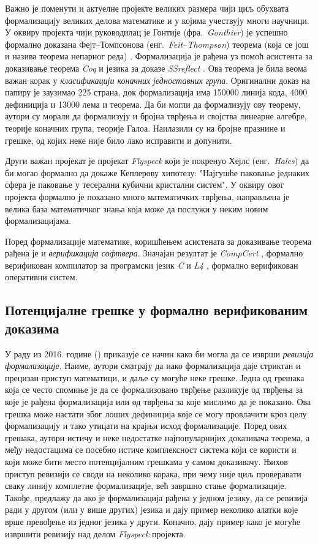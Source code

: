 Важно је поменути и актуелне пројекте великих размера чији циљ
обухвата формализацију великих делова математике и у којима учествују
многи научници. У оквиру пројекта чији руководилац је Гонтије
(фра.~\emph{Gonthier}) је успешно формално доказана Фејт--Томпсонова
(енг.~\emph{Feit--Thompson}) теорема (која се још и назива теорема
непарног реда) \cite{oddOrder}. Формализација је рађена уз помоћ
асистента за доказивање теорема \emph{Coq} и језика за доказе
\emph{SSreflect} \cite{gonthierSSReflect}. Ова теорема је била веома
важан корак у \emph{класификацији коначних једноставних
  група}. Оригинални доказ на папиру је заузимао 225 страна, док
формализација има 150000 линија кода, 4000 дефиниција и 13000 лема и
теорема. Да би могли да формализују ову теорему, аутори су морали да
формализују и бројна тврђења и својства линеарне алгебре, теорије
коначних група, теорије Галоа. Наилазили су на бројне празнине и
грешке, од којих неке није било лако исправити и допунити.

Други важан пројекат је пројекат \emph{Flyspeck} \cite{flyspeck} који
је покренуо Хејлс (енг.~\emph{Hales}) да би могао формално да докаже
Кеплерову хипотезу: "Најгушће паковање једнаких сфера је паковање у
тесерални кубични кристални систем". У оквиру овог пројекта формално
је показано много математичких тврђења, направљена је велика база
математичког знања која може да послужи у неким новим формализацијама.

Поред фор\-ма\-ли\-за\-ци\-је математике, коришћењем асистената за
доказивање теорема рађена је и \emph{верификација софтвера}. Значајан
резултат је \emph{CompCert} \cite{compcert1, compcert2}, формално
верификован компилатор за програмски језик \emph{C} и \emph{L4}
\cite{l4microkernel1, l4microkernel2}, формално верификован оперативни
систем.


\subsection{Потенцијалне грешке у формално верификованим доказима}

У раду из 2016. године (\cite{adams2015proof}) приказује се начин како
би могла да се изврши \emph{ревизија формализације}. Наиме, аутори
сматрају да иако формализација даје стриктан и прецизан приступ
математици, и даље су могуће неке грешке. Једна од грешака која се
често спомиње је да се формализовано тврђење разликује од тврђења за
које је рађена формализација или од тврђења за које мислимо да је
показано. Ова грешка може настати због лоших дефиниција које се могу
провлачити кроз целу формализацију и тако утицати на крајњи исход
формализације. Поред ових грешака, аутори истичу и неке недостатке
најпопуларнијих доказивача теорема, а међу недостацима се посебно
истиче комплексност система који се користи и који може бити место
потенцијалним грешкама у самом доказивачу. Њихов приступ ревизији се
своди на неколико корака, при чему није циљ проверавати сваку линију
комплетне формализације, већ завршно стање формализације. Такође,
предлажу да ако је формализација рађена у једном језику, да се
ревизија ради у другом (или у више других) језика и дају пример
неколико алатки које врше превођење из једног језика у други. Коначно,
дају пример како је могуће извршити ревизију над делом \emph{Flyspeck}
пројекта.


